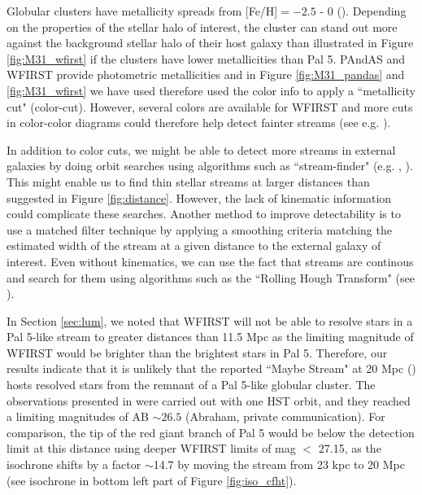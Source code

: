 \documentclass[twocolumn]{aastex62}
\begin{document}
Globular clusters have metallicity spreads from [Fe/H]$ = -2.5$ - 0 (\citealt{harris96}). Depending on the properties of the stellar halo of interest, the cluster can stand out more against the background stellar halo of their host galaxy than illustrated in Figure \ref{fig:M31_wfirst} if the clusters have lower metallicities than Pal 5. PAndAS and WFIRST provide photometric metallicities and in Figure \ref{fig:M31_pandas} and \ref{fig:M31_wfirst} we have used therefore used the color info to apply a ``metallicity cut" (color-cut). 
However, several colors are available for WFIRST and more cuts in color-color diagrams could therefore help detect fainter streams (see e.g. \citealt{shipp18}). 

In addition to color cuts, we might be able to detect more streams in external galaxies by doing orbit searches using algorithms such as ``stream-finder" (e.g. \citealt{malhan18}, \citealt{ibata19}). This might enable us to find thin stellar streams at larger distances than suggested in Figure \ref{fig:distance}. However, the lack of kinematic information could complicate these searches. Another method to improve detectability is to use a matched filter technique by applying a smoothing criteria matching the estimated width of the stream at a given distance to the external galaxy of interest. Even without kinematics, we can use the fact that streams are continous and search for them using algorithms such as the ``Rolling Hough Transform" (see \citealt{clark14}). 

In Section \ref{sec:lum}, we noted that WFIRST will not be able to resolve stars in a Pal 5-like stream to greater distances than 11.5 Mpc as the limiting magnitude of WFIRST would be brighter than the brightest stars in Pal 5. Therefore, our results indicate that it is unlikely that the reported ``Maybe Stream" at 20 Mpc (\citealt{abraham18}) hosts resolved stars from the remnant of a Pal 5-like globular cluster. The observations presented in \citet{abraham18}  were carried out with one HST orbit, and they reached a limiting magnitudes of AB ${\sim} 26.5$ (Abraham, private communication). For comparison, the tip of the red giant branch of Pal 5 would be  below the detection limit at this distance using deeper WFIRST limits of mag $<$ 27.15, as the isochrone shifts by a factor ${\sim}$14.7 by moving the stream from 23 kpc to 20 Mpc (see isochrone in bottom left part of Figure \ref{fig:iso_cfht}). 
\end{document}
